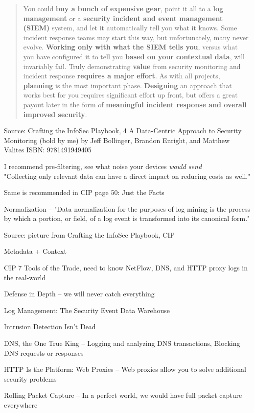 \documentclass[Screen16to9,17pt]{foils}
\begin{document}
\begin{quote}\small
You could {\bf buy a bunch of expensive gear}, point it all to a {\bf log management} or a {\bf security incident and event management (SIEM)} system, and let it automatically tell you what it knows. Some incident response teams may start this way, but unfortunately, many never evolve. {\bf Working only with what the SIEM tells you}, versus what you have configured it to tell you {\bf based on your contextual data}, will invariably fail. Truly demonstrating {\bf value} from security monitoring and incident response {\bf requires a major effort}. As with all projects, {\bf planning} is the most important phase. {\bf Designing} an approach that works best for you requires significant effort up front, but offers a great payout later in the form of {\bf meaningful incident response and overall improved security}.
\end{quote}
Source: Crafting the InfoSec Playbook, 4 A Data-Centric Approach to Security Monitoring (bold by me)
by Jeff Bollinger, Brandon Enright, and Matthew Valites ISBN: 9781491949405

\begin{list2}
\item I recommend pre-filtering, see what noise your devices \emph{would send}\\
"Collecting only relevant data can have a direct impact on reducing costs as well."
\item Same is recommended in CIP page 50: Just the Facts
\item Normalization -- "Data normalization for
the purposes of log mining is the process by which a portion, or field, of a log event is
transformed into its canonical form."
\end{list2}



Source: picture from Crafting the InfoSec Playbook, CIP

Metadata + Context


\begin{list1}
\item CIP 7 Tools of the Trade, need to know NetFlow, DNS, and HTTP proxy logs in the real-world
\begin{list2}
\item Defense in Depth -- we will never catch everything
\item Log Management: The Security Event Data Warehouse
\item Intrusion Detection Isn’t Dead
\item DNS, the One True King -- Logging and analyzing DNS transactions, Blocking DNS requests or responses
\item HTTP Is the Platform: Web Proxies -- Web proxies allow you to solve additional security problems
\item Rolling Packet Capture -- In a perfect world, we would have full packet capture everywhere
\end{list2}
\end{list1}
\end{document}
